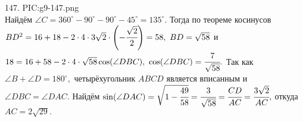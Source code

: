 147. {{PIC:g9-147.png}}\\
Найдём $\angle C=360^\circ-90^\circ-90^\circ-45^\circ=135^\circ.$ Тогда по теореме косинусов $BD^2=16+18-2\cdot4\cdot3\sqrt{2}\cdot\left(-\cfrac{\sqrt{2}}{2}\right)=58,\ BD=\sqrt{58}$ и $18=16+58-2\cdot4\cdot\sqrt{58}\cos(\angle DBC),\ \cos(\angle DBC)=\cfrac{7}{\sqrt{58}}.$ Так как $\angle B+\angle D=180^\circ,$ четырёхугольник $ABCD$ является вписанным и $\angle DBC=\angle DAC.$ Найдём $\sin(\angle DAC)=\sqrt{1-\cfrac{49}{58}}=\cfrac{3}{\sqrt{58}}=\cfrac{CD}{AC}=\cfrac{3\sqrt{2}}{AC},$ откуда $AC=2\sqrt{29}.$\newpage\noindent
